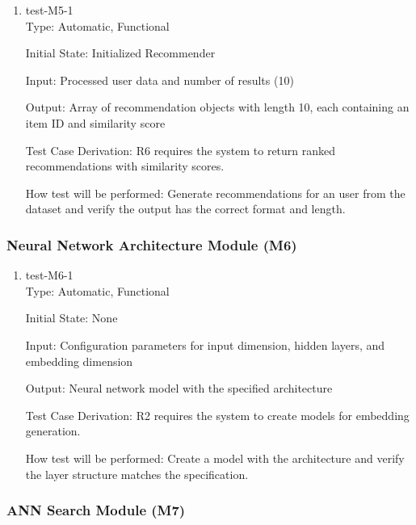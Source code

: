\documentclass[12pt, titlepage]{article}
\begin{document}
\begin{enumerate}

\item{test-M5-1\\}
Type: Automatic, Functional
					
Initial State: Initialized Recommender
					
Input: Processed user data and number of results (10)
					
Output: Array of recommendation objects with length 10, each containing an item ID and similarity score

Test Case Derivation: R6 requires the system to return ranked recommendations with similarity scores.

How test will be performed: Generate recommendations for an user from the dataset and verify the output has the correct format and length.

\end{enumerate}

\subsubsection{Neural Network Architecture Module (M6)}

\begin{enumerate}

\item{test-M6-1\\}
Type: Automatic, Functional
					
Initial State: None
					
Input: Configuration parameters for input dimension, hidden layers, and embedding dimension
					
Output: Neural network model with the specified architecture

Test Case Derivation: R2 requires the system to create models for embedding generation.

How test will be performed: Create a model with the architecture and verify the layer structure matches the specification.

\end{enumerate}
\subsubsection{ANN Search Module (M7)}
\end{document}
